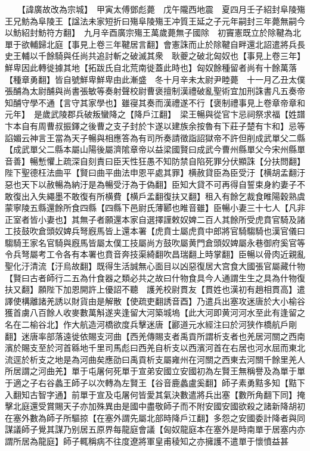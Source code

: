 　　【諱廣故改為宗城】　甲寅太傅鄧彪薨　戊午隴西地震　夏四月壬子紹封阜陵殤王兄魴為阜陵王【諡法未家短折曰殤阜陵殤王冲質王延之子元年嗣封三年薨無嗣今以魴紹封魴符方翻】　九月辛酉廣宗殤王萬歲薨無子國除　初竇憲既立於除鞬為北單于欲輔歸北庭【事見上卷三年鞬居言翻】會憲誅而止於除鞬自畔還北詔遣將兵長史王輔以千餘騎與任尚共追討斬之破滅其衆　耿夔之破北匈奴也【事見上卷三年】鮮卑因此轉徙據其地【拓跋氏自北荒南徙蓋此時也】匈奴餘種留者尚有十餘萬落【種章勇翻】皆自號鮮卑鮮卑由此漸盛　冬十月辛未太尉尹睦薨　十一月乙丑太僕張酺為太尉酺與尚書張敏等奏射聲校尉曹褒擅制漢禮破亂聖術宜加刑誅書凡五奏帝知酺守學不通【言守其家學也】雖寑其奏而漢禮遂不行【褒制禮事見上卷章帝章和元年】　是歲武陵郡兵破叛蠻降之【降戶江翻】　梁王暢與從官卞忌祠祭求福【姓譜卞本自有周曹叔振鐸之後曹之支子封於卞遂以建族余按魯有下莊子楚有卞和】忌等諂媚云神言王當為天子暢與相應答為有司所奏請徵詣詔獄帝不許但削成武單父二縣【成武單父二縣本屬山陽後屬濟隂章帝以益梁國賢曰成武今曹州縣單父今宋州縣單音善】暢慙懼上疏深自刻責曰臣天性狂愚不知防禁自陷死罪分伏顯誅【分扶問翻】陛下聖德枉法曲平【賢曰曲平曲法申恩平處其罪】横赦貸臣為臣受汙【横胡孟翻汙惡也天下以赦暢為納汙是為暢受汙為于偽翻】臣知大貸不可再得自誓束身約妻子不敢復出入失繩墨不敢復有所横費【横戶孟翻復扶又翻】租入有餘乞裁食睢陽穀熟虞蒙寧陵五縣還餘所食四縣【四縣下邑尉氏薄郾也睢音雖】臣暢小妻三十七人【凡非正室者皆小妻也】其無子者願還本家自選擇謹敕奴婢二百人其餘所受虎賁官騎及諸工技鼓吹倉頭奴婢兵弩廐馬皆上還本署【虎賁士屬虎賁中郎將官騎騶騎也漢官儀曰騶騎王家名官騎與廐馬皆屬太僕工技屬尚方鼓吹屬黄門倉頭奴婢屬永巷御府奚官等令兵弩屬考工令各有本署也賁音奔技渠綺翻吹昌瑞翻上時掌翻】臣暢以骨肉近親亂聖化汙清流【汙烏故翻】既得生活誠無心面目以凶惡復居大宫食大國張官屬藏什物【賢曰古者師行二五為什食器之類必共之故曰什物食具今人通謂生生之具為什物復扶又翻】願陛下加恩開許上優詔不聽　護羌校尉貫友【貫姓也漢初有趙相貫高】遣譯使構離諸羌誘以財貨由是解散【使疏吏翻誘音酉】乃遣兵出塞攻迷唐於大小榆谷獲首虜八百餘人收麥數萬斛遂夹逢留大河築城塢【此大河即黄河河水至此有逢留之名在二榆谷北】作大航造河橋欲度兵擊迷唐【酈道元水經注曰於河狭作橋航戶剛翻】迷唐率部落遠徙依賜支河曲【西羌傳賜支者禹貢所謂析支者也羌居河關之西南濱於賜支至於河首緜地千里司馬彪曰西羌自析支以西濱河首在右居也河水屈而東北流逕於析支之地是為河曲矣應劭曰禹貢析支屬雍州在河關之西東去河關千餘里羌人所居謂之河曲羌】單于屯屠何死單于宣弟安國立安國初為左賢王無稱譽及為單于單于適之子右谷蠡王師子以次轉為左賢王【谷音鹿蠡盧奚翻】師子素勇黠多知【黠下入翻知古智字通】前單于宣及屯屠何皆愛其氣決數遣將兵出塞【數所角翻下同】掩擊北庭還受賞賜天子亦加殊異由是國中盡敬師子而不附安國安國欲殺之諸新降胡初在塞外數為師子所驅掠【在塞外謂先屬北部時降戶江翻】多怨之安國委計降者與同謀議師子覺其謀乃别居五原界每龍庭會議【匈奴龍庭本在塞外是時南單于居塞内亦謂所居為龍庭】師子輒稱病不往度遼將軍皇甫稜知之亦擁護不遣單于懷憤益甚

